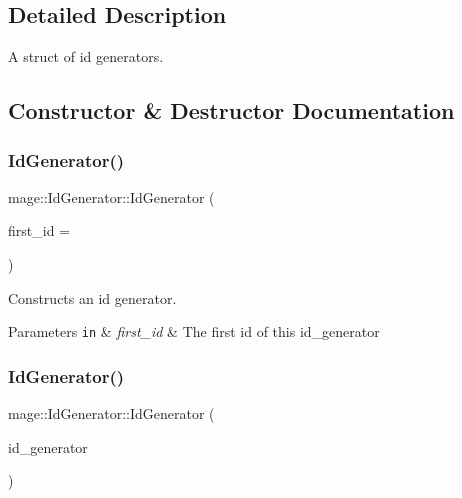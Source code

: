 \subsection{Detailed Description}
A struct of id generators. 

\subsection{Constructor \& Destructor Documentation}
\hypertarget{structmage_1_1_id_generator_a10fccba8287b8e7ace574b690a197561}{}\label{structmage_1_1_id_generator_a10fccba8287b8e7ace574b690a197561} 
\subsubsection{\texorpdfstring{Id\+Generator()}{IdGenerator()}\hspace{0.1cm}{\footnotesize\ttfamily [1/3]}}
{\footnotesize\ttfamily mage\+::\+Id\+Generator\+::\+Id\+Generator (\begin{DoxyParamCaption}\item[{int32\+\_\+t}]{first\+\_\+id = {} }\end{DoxyParamCaption})\hspace{0.3cm}{\ttfamily [explicit]}}

Constructs an id generator.


\begin{DoxyParams}[1]{Parameters}
\mbox{\tt in}  & {\em first\+\_\+id} & The first id of this id\+\_\+generator \\
\hline
\end{DoxyParams}
\hypertarget{structmage_1_1_id_generator_a6f502d2cd8b63e7c76f31834b028a11d}{}\label{structmage_1_1_id_generator_a6f502d2cd8b63e7c76f31834b028a11d} 
\subsubsection{\texorpdfstring{Id\+Generator()}{IdGenerator()}\hspace{0.1cm}{\footnotesize\ttfamily [2/3]}}
{\footnotesize\ttfamily mage\+::\+Id\+Generator\+::\+Id\+Generator (\begin{DoxyParamCaption}\item[{const \hyperlink{structmage_1_1_id_generator}{Id\+Generator} \&}]{id\+\_\+generator }\end{DoxyParamCaption})\hspace{0.3cm}{\ttfamily [delete]}}

